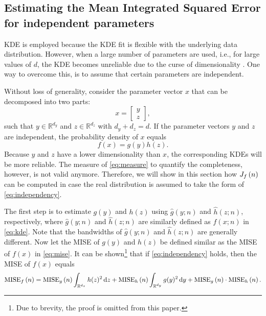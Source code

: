 \subsection{Estimating the Mean Integrated Squared Error for independent parameters}
\label{sec:mise independent}

KDE is employed because the KDE fit is flexible with the underlying data distribution. However, when a large number of parameters are used, i.e., for large values of $d$, the KDE becomes unreliable due to the curse of dimensionality \cite{scott2015multivariate}. One way to overcome this, is to assume that certain parameters are independent. 

Without loss of generality, consider the parameter vector $x$ that can be decomposed into two parts:
\begin{equation}
	x = \begin{bmatrix}
		y \\ z
	\end{bmatrix},
\end{equation}
such that $y \in \mathbb{R}^{d_y}$ and $z \in \mathbb{R}^{d_z}$ with $d_y+d_z=d$. If the parameter vectors $y$ and $z$ are independent, the probability density of $x$ equals
\begin{equation}
	\label{eq:independency}
	f(x) = g(y) h(z).
\end{equation}
Because $y$ and $z$ have a lower dimensionality than $x$, the corresponding KDEs will be more reliable. The measure of \cref{eq:measure} to quantify the completeness, however, is not valid anymore. Therefore, we will show in this section how $J_{f} \left( n \right)$ can be computed in case the real distribution is assumed to take the form of \cref{eq:independency}.

The first step is to estimate $g(y)$ and $h(z)$ using $\hat{g}(y;n)$ and $\hat{h}(z;n)$, respectively, where $\hat{g}(y;n)$ and $\hat{h}(z;n)$ are similarly defined as $\hat{f}(x;n)$ in \cref{eq:kde}. Note that the bandwidths of $\hat{g}(y;n)$ and $\hat{h}(z;n)$ are generally different. Now let the MISE of $g(y)$ and $h(z)$ be defined similar as the MISE of $f(x)$ in \cref{eq:mise}. It can be shown\footnote{Due to brevity, the proof is omitted from this paper.} that if \cref{eq:independency} holds, then the MISE of $f(x)$ equals
\begin{dmath}
	\label{eq:mise independent}
	\mise{f}{n} = \mise{g}{n} \int_{\mathbb{R}^{d_z}} h(z)^2 \ud z + \mise{h}{n} \int_{\mathbb{R}^{d_y}} g(y)^2 \ud y + \mise{g}{n} \cdot \mise{h}{n}.
\end{dmath}

